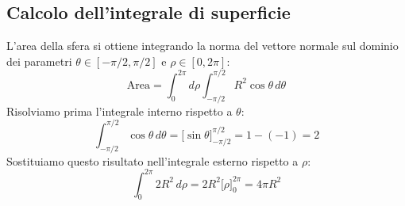 \subsection{Calcolo dell'integrale di superficie}
L'area della sfera si ottiene integrando la norma del vettore normale sul dominio dei parametri $\theta \in [-\pi/2, \pi/2]$ e $\rho \in [0, 2\pi]$:
\[
\text{Area} = \int_{0}^{2\pi} d\rho \int_{-\pi/2}^{\pi/2} R^2 \cos\theta \, d\theta
\]
Risolviamo prima l'integrale interno rispetto a $\theta$:
\[
\int_{-\pi/2}^{\pi/2} \cos\theta \, d\theta = \Big[\sin\theta\Big]_{-\pi/2}^{\pi/2} = 1 - (-1) = 2
\]
Sostituiamo questo risultato nell'integrale esterno rispetto a $\rho$:
\[
\int_{0}^{2\pi} 2R^2 \, d\rho = 2R^2 \Big[\rho\Big]_{0}^{2\pi} = 4\pi R^2
\]